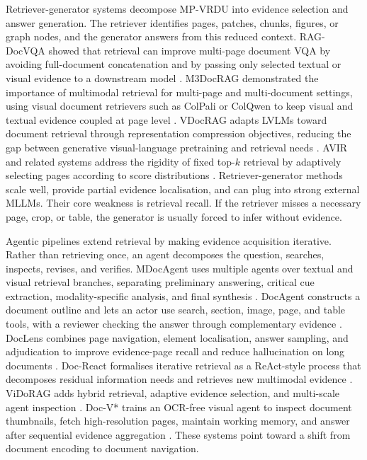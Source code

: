 \documentclass[10pt,a4paper]{article}
\begin{document}
Retriever-generator systems decompose MP-VRDU into evidence selection and answer generation. The retriever identifies pages, patches, chunks, figures, or graph nodes, and the generator answers from this reduced context. RAG-DocVQA showed that retrieval can improve multi-page document VQA by avoiding full-document concatenation and by passing only selected textual or visual evidence to a downstream model \cite{lopez2025enhancing}. M3DocRAG demonstrated the importance of multimodal retrieval for multi-page and multi-document settings, using visual document retrievers such as ColPali or ColQwen to keep visual and textual evidence coupled at page level \cite{cho2024m3docrag,faysse2024colpali}. VDocRAG adapts LVLMs toward document retrieval through representation compression objectives, reducing the gap between generative visual-language pretraining and retrieval needs \cite{tanaka2025vdocrag}. AVIR and related systems address the rigidity of fixed top-$k$ retrieval by adaptively selecting pages according to score distributions \cite{li2025avir}. Retriever-generator methods scale well, provide partial evidence localisation, and can plug into strong external MLLMs. Their core weakness is retrieval recall. If the retriever misses a necessary page, crop, or table, the generator is usually forced to infer without evidence.

Agentic pipelines extend retrieval by making evidence acquisition iterative. Rather than retrieving once, an agent decomposes the question, searches, inspects, revises, and verifies. MDocAgent uses multiple agents over textual and visual retrieval branches, separating preliminary answering, critical cue extraction, modality-specific analysis, and final synthesis \cite{han2025mdocagent}. DocAgent constructs a document outline and lets an actor use search, section, image, page, and table tools, with a reviewer checking the answer through complementary evidence \cite{sun2025docagent}. DocLens combines page navigation, element localisation, answer sampling, and adjudication to improve evidence-page recall and reduce hallucination on long documents \cite{zhu2025doclens}. Doc-React formalises iterative retrieval as a ReAct-style process that decomposes residual information needs and retrieves new multimodal evidence \cite{wu2025doc}. ViDoRAG adds hybrid retrieval, adaptive evidence selection, and multi-scale agent inspection \cite{wang2025vidorag}. Doc-V* trains an OCR-free visual agent to inspect document thumbnails, fetch high-resolution pages, maintain working memory, and answer after sequential evidence aggregation \cite{zheng2026doc}. These systems point toward a shift from document encoding to document navigation.
\end{document}
